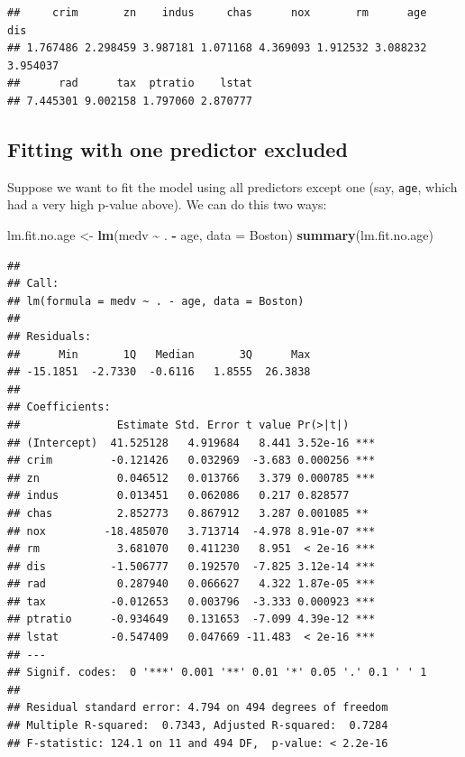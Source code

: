 \documentclass[
  11pt,
]{article}
\newenvironment{Shaded}{\begin{snugshade}}{\end{snugshade}}
\newcommand{\AttributeTok}[1]{\textcolor[rgb]{0.13,0.29,0.53}{#1}}
\newcommand{\FunctionTok}[1]{\textcolor[rgb]{0.13,0.29,0.53}{\textbf{#1}}}
\newcommand{\NormalTok}[1]{#1}
\newcommand{\OtherTok}[1]{\textcolor[rgb]{0.56,0.35,0.01}{#1}}
\newcommand{\SpecialCharTok}[1]{\textcolor[rgb]{0.81,0.36,0.00}{\textbf{#1}}}
\begin{document}
\begin{verbatim}
##     crim       zn    indus     chas      nox       rm      age      dis 
## 1.767486 2.298459 3.987181 1.071168 4.369093 1.912532 3.088232 3.954037 
##      rad      tax  ptratio    lstat 
## 7.445301 9.002158 1.797060 2.870777
\end{verbatim}

\subsection{Fitting with one predictor
excluded}\label{fitting-with-one-predictor-excluded}

Suppose we want to fit the model using all predictors except one (say,
\texttt{age}, which had a very high p-value above). We can do this two
ways:

\begin{Shaded}
\begin{Highlighting}[]
\NormalTok{lm.fit.no.age }\OtherTok{\textless{}{-}} \FunctionTok{lm}\NormalTok{(medv }\SpecialCharTok{\textasciitilde{}}\NormalTok{ . }\SpecialCharTok{{-}}\NormalTok{ age, }\AttributeTok{data =}\NormalTok{ Boston)}
\FunctionTok{summary}\NormalTok{(lm.fit.no.age)}
\end{Highlighting}
\end{Shaded}

\begin{verbatim}
## 
## Call:
## lm(formula = medv ~ . - age, data = Boston)
## 
## Residuals:
##      Min       1Q   Median       3Q      Max 
## -15.1851  -2.7330  -0.6116   1.8555  26.3838 
## 
## Coefficients:
##               Estimate Std. Error t value Pr(>|t|)    
## (Intercept)  41.525128   4.919684   8.441 3.52e-16 ***
## crim         -0.121426   0.032969  -3.683 0.000256 ***
## zn            0.046512   0.013766   3.379 0.000785 ***
## indus         0.013451   0.062086   0.217 0.828577    
## chas          2.852773   0.867912   3.287 0.001085 ** 
## nox         -18.485070   3.713714  -4.978 8.91e-07 ***
## rm            3.681070   0.411230   8.951  < 2e-16 ***
## dis          -1.506777   0.192570  -7.825 3.12e-14 ***
## rad           0.287940   0.066627   4.322 1.87e-05 ***
## tax          -0.012653   0.003796  -3.333 0.000923 ***
## ptratio      -0.934649   0.131653  -7.099 4.39e-12 ***
## lstat        -0.547409   0.047669 -11.483  < 2e-16 ***
## ---
## Signif. codes:  0 '***' 0.001 '**' 0.01 '*' 0.05 '.' 0.1 ' ' 1
## 
## Residual standard error: 4.794 on 494 degrees of freedom
## Multiple R-squared:  0.7343, Adjusted R-squared:  0.7284 
## F-statistic: 124.1 on 11 and 494 DF,  p-value: < 2.2e-16
\end{verbatim}
\end{document}
